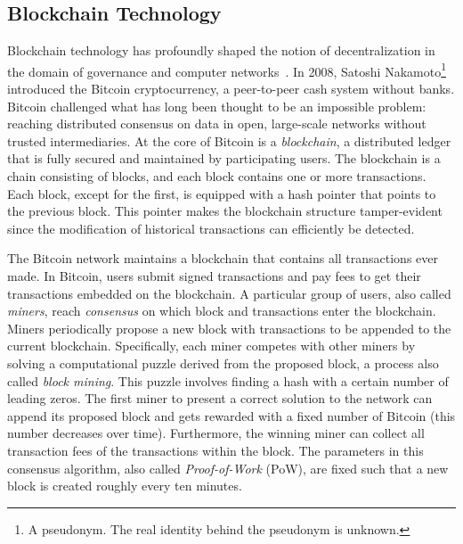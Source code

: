 \subsection{Blockchain Technology}
Blockchain technology has profoundly shaped the notion of decentralization in the domain of governance and computer networks~\cite{aste2017blockchain}.
In 2008, Satoshi Nakamoto\footnote{A pseudonym. The real identity behind the pseudonym is unknown.} introduced the Bitcoin cryptocurrency, a peer-to-peer cash system without banks.
Bitcoin challenged what has long been thought to be an impossible problem: reaching distributed consensus on data in open, large-scale networks without trusted intermediaries.
At the core of Bitcoin is a \emph{blockchain}, a distributed ledger that is fully secured and maintained by participating users.
The blockchain is a chain consisting of blocks, and each block contains one or more transactions.
Each block, except for the first, is equipped with a hash pointer that points to the previous block.
This pointer makes the blockchain structure tamper-evident since the modification of historical transactions can efficiently be detected.

The Bitcoin network maintains a blockchain that contains all transactions ever made.
In Bitcoin, users submit signed transactions and pay fees to get their transactions embedded on the blockchain.
A particular group of users, also called \emph{miners}, reach \emph{consensus} on which block and transactions enter the blockchain.
Miners periodically propose a new block with transactions to be appended to the current blockchain.
Specifically, each miner competes with other miners by solving a computational puzzle derived from the proposed block, a process also called \emph{block mining}.
This puzzle involves finding a hash with a certain number of leading zeros.
The first miner to present a correct solution to the network can append its proposed block and gets rewarded with a fixed number of Bitcoin (this number decreases over time).
Furthermore, the winning miner can collect all transaction fees of the transactions within the block.
The parameters in this consensus algorithm, also called \emph{Proof-of-Work} (PoW), are fixed such that a new block is created roughly every ten minutes.

